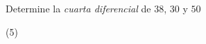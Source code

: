 \item{Determine la \textit{cuarta diferencial} de $38$, $30$ y $50$
	\begin{tasks}(5)
	\end{tasks}
}